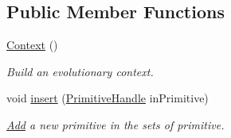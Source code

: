 \subsection*{Public Member Functions}
\begin{DoxyCompactItemize}
\item 
\hypertarget{classPuppy_1_1Context_aac8cb79c11fb01a719665573dbe2401b}{}\hyperlink{classPuppy_1_1Context_aac8cb79c11fb01a719665573dbe2401b}{Context} ()\label{classPuppy_1_1Context_aac8cb79c11fb01a719665573dbe2401b}

\begin{DoxyCompactList}\small\item\em Build an evolutionary context. \end{DoxyCompactList}\item 
void \hyperlink{classPuppy_1_1Context_a8faebd159ee947f837755a6bbc7bccbb}{insert} (\hyperlink{classPuppy_1_1PrimitiveHandle}{Primitive\+Handle} in\+Primitive)
\begin{DoxyCompactList}\small\item\em \hyperlink{classAdd}{Add} a new primitive in the sets of primitive. \end{DoxyCompactList}\end{DoxyCompactItemize}
